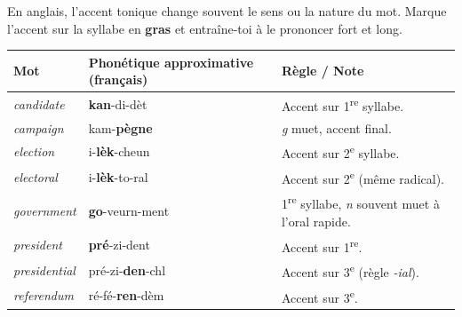 \documentclass[11pt]{article}
\newcommand{\eng}[1]{\ifmmode\text{\textit{#1}}\else\begingroup\selectlanguage{english}\itshape #1\endgroup\fi}
\begin{document}
\begin{exemplebox}
En anglais, l'accent tonique change souvent le sens ou la nature du mot. Marque l'accent sur la syllabe en \textbf{gras} et entraîne-toi à le prononcer fort et long.
\begin{center}
\begin{tabular}{|l|l|l|}
\hline
\rowcolor{popblueL} \textbf{Mot} & \textbf{Phonétique approximative (français)} & \textbf{Règle / Note} \\
\hline
\eng{candidate} & \textbf{kan}-di-dèt & Accent sur 1\textsuperscript{re} syllabe. \\
\eng{campaign} & kam-\textbf{pègne} & \emph{g} muet, accent final. \\
\eng{election} & i-\textbf{lèk}-cheun & Accent sur 2\textsuperscript{e} syllabe. \\
\eng{electoral} & i-\textbf{lèk}-to-ral & Accent sur 2\textsuperscript{e} (même radical). \\
\eng{government} & \textbf{go}-veurn-ment & 1\textsuperscript{re} syllabe, \emph{n} souvent muet à l'oral rapide. \\
\eng{president} & \textbf{pré}-zi-dent & Accent sur 1\textsuperscript{re}. \\
\eng{presidential} & pré-zi-\textbf{den}-chl & Accent sur 3\textsuperscript{e} (règle \emph{-ial}). \\
\eng{referendum} & ré-fé-\textbf{ren}-dèm & Accent sur 3\textsuperscript{e}. \\
\hline
\end{tabular}
\end{center}
\end{exemplebox}
\end{document}
